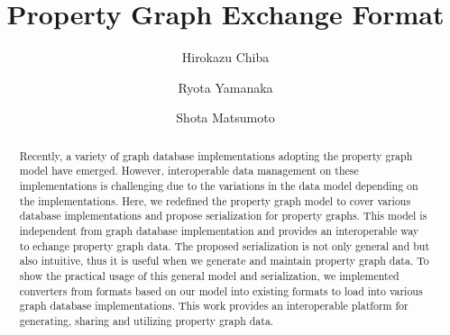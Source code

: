 \documentclass[runningheads]{llncs}
\begin{document}
\newtheorem{defi}[theorem]{Definition}
%
\title{Property Graph Exchange Format}
%
%
\author{Hirokazu Chiba \and Ryota Yamanaka \and Shota Matsumoto}
%
%
%
\maketitle              %
%
\begin{abstract}
Recently, a variety of graph database implementations adopting the property graph model have emerged.
However, interoperable data management on these implementations is challenging due to the variations in the data model depending on the implementations.
Here, we redefined the property graph model to cover various database implementations and propose serialization for property graphs. 
This model is independent from graph database implementation and provides an interoperable way to echange property graph data. The proposed serialization is not only general and but also intuitive, thus it is useful when we generate and maintain property graph data. To show the practical usage of this general model and serialization, we implemented converters from formats based on our model into existing formats to load into various graph database implementations. This work provides an interoperable platform for generating, sharing and utilizing property graph data.
\end{abstract}
\end{document}
